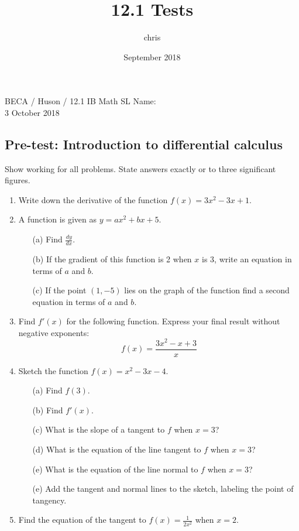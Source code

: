 \documentclass{article}
\title{12.1 Tests}
\author{chris }
\date{September 2018}
\begin{document}
\noindent BECA / Huson / 12.1 IB Math SL \qquad \qquad Name:\\
3 October 2018
\subsection*{Pre-test: Introduction to differential calculus}
Show working for all problems. State answers exactly or to three significant figures.

\begin{enumerate}

\item Write down the derivative of the function $f(x) = 3x^2 - 3x + 1$.

\item	A function is given as $y = ax^2 + bx + 5$.

\begin{itemize}
    \item[(a)] Find $\displaystyle \frac {dy}{dx}$.
	\item[(b)] If the gradient of this function is 2 when $x$ is 3, write an equation in terms of $a$ and $b$.
	\item[(c)] If the point $(1, -5)$ lies on the graph of the function find a second equation in terms of $a$ and $b$.
\end{itemize}

\item Find $f'(x)$  for the following function. Express your final result without negative exponents:
	 \[	f(x) = \frac{3x^2-x+3}{x}\]

\item	Sketch the function $f(x) = x^2 - 3x - 4$.
\begin{itemize}
    \item[(a)] Find $f(3)$.
	\item[(b)] Find $f'(x)$.
	\item[(c)] What is the slope of a tangent to $f$ when $x=3$?
	\item[(d)] What is the equation of the line tangent to $f$ when $x=3$?
	\item[(e)] What is the equation of the line normal to $f$ when $x=3$?
	\item[(e)] Add the tangent and normal lines to the sketch, labeling the point of tangency.
\end{itemize}

\item Find the equation of the tangent to $\displaystyle f(x) = \frac{1}{2x^2}$ when $x = 2$.


\end{enumerate}
\end{document}
